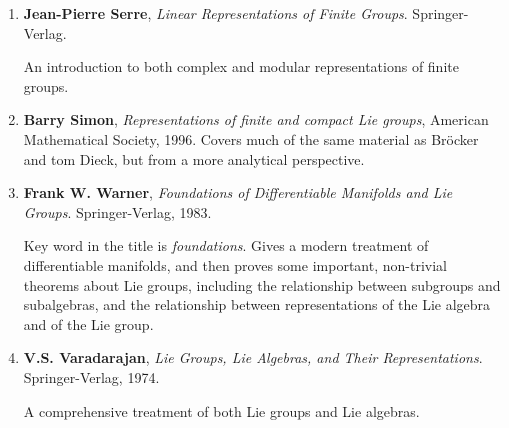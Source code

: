 \documentclass{amsbook}
\theoremstyle{plain}
\numberwithin{equation}{chapter}
\numberwithin{theorem}{chapter}
\begin{document}
\begin{enumerate}
\item \textbf{Jean-Pierre Serre}, \textit{Linear Representations of Finite
Groups}. Springer-Verlag.

An introduction to both complex and modular representations of finite groups.

\item \textbf{Barry Simon}, \textit{Representations of finite and compact Lie
groups}, American Mathematical Society, 1996. Covers much of the same material
as Br\"{o}cker and tom Dieck, but from a more analytical perspective.

\item \textbf{Frank W. Warner}, \textit{Foundations of Differentiable
Manifolds and Lie Groups}. Springer-Verlag, 1983.

Key word in the title is \textit{foundations}. Gives a modern treatment of
differentiable manifolds, and then proves some important, non-trivial theorems
about Lie groups, including the relationship between subgroups and
subalgebras, and the relationship between representations of the Lie algebra
and of the Lie group.

\item \textbf{V.S. Varadarajan}, \textit{Lie Groups, Lie Algebras, and Their
Representations}. Springer-Verlag, 1974.

A comprehensive treatment of both Lie groups and Lie algebras.
\end{enumerate}
\end{document}
